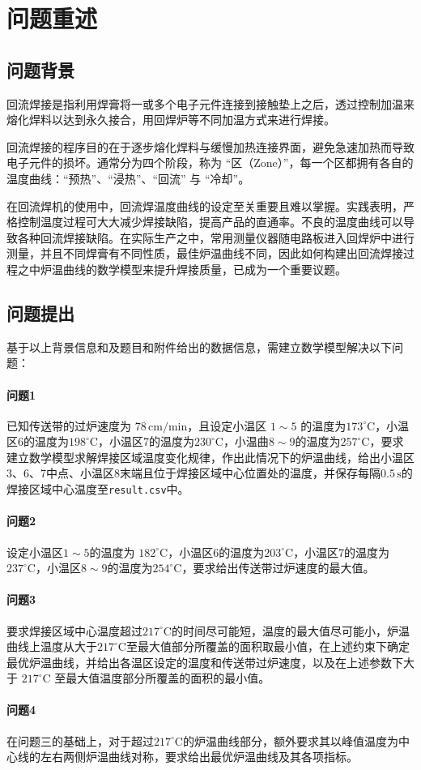 \documentclass[../main.tex]{subfiles}
\begin{document}
\section{问题重述}
\subsection{问题背景}
回流焊接是指利用焊膏将一或多个电子元件连接到接触垫上之后，透过控制加温来熔化焊料以达到永久接合，用回焊炉等不同加温方式来进行焊接。

回流焊接的程序目的在于逐步熔化焊料与缓慢加热连接界面，避免急速加热而导致电子元件的损坏。通常分为四个阶段，称为 “区（Zone）”，每一个区都拥有各自的温度曲线：“预热”、“浸热”、“回流” 与 “冷却”。

在回流焊机的使用中，回流焊温度曲线的设定至关重要且难以掌握。实践表明，严格控制温度过程可大大减少焊接缺陷，提高产品的直通率。不良的温度曲线可以导致各种回流焊接缺陷。在实际生产之中，常用测量仪器随电路板进入回焊炉中进行测量，并且不同焊膏有不同性质，最佳炉温曲线不同，因此如何构建出回流焊接过程之中炉温曲线的数学模型来提升焊接质量，已成为一个重要议题。

\subsection{问题提出} %
基于以上背景信息和及题目和附件给出的数据信息，需建立数学模型解决以下问题：

\paragraph{问题1}
已知传送带的过炉速度为 \(78\,\mathrm{cm}/\mathrm{min}\)，且设定小温区 \(1{\sim}5\) 的温度为\(173^{\circ} \mathrm{C}\)，小温区6的温度为\(198^{\circ}\mathrm{C}\)，小温区7的温度为\(230^{\circ}\mathrm{C}\)，小温曲\(8{ \sim }9\)的温度为\(257^{\circ}\mathrm{C}\)，要求建立数学模型求解焊接区域温度变化规律，作出此情况下的炉温曲线，给出小温区3、6、7中点、小温区8末端且位于焊接区域中心位置处的温度，并保存每隔\(0.5\, \mathrm{s}\)的焊接区域中心温度至\texttt{result.csv}中。

\paragraph{问题2}
设定小温区\(1{\sim}5\)的温度为 \(182^{\circ}\mathrm{C}\)，小温区6的温度为\(203^{\circ}\mathrm{C}\)，小温区7的温度为\(237^{\circ}\mathrm{C}\)，小温区\(8{\sim}9\)的温度为\(254^{\circ}\mathrm{C}\)，要求给出传送带过炉速度的最大值。

\paragraph{问题3}
要求焊接区域中心温度超过\(217^{\circ}\mathrm{C}\)的时间尽可能短，温度的最大值尽可能小，炉温曲线上温度从大于\(217^{\circ}\mathrm{C}\)至最大值部分所覆盖的面积取最小值，在上述约束下确定最优炉温曲线，并给出各温区设定的温度和传送带过炉速度，以及在上述参数下大于 \(217 ^{\circ}\mathrm{C}\) 至最大值温度部分所覆盖的面积的最小值。

\paragraph{问题4}
在问题三的基础上，对于超过\(217 ^{\circ}\mathrm{C}\)的炉温曲线部分，额外要求其以峰值温度为中心线的左右两侧炉温曲线对称，要求给出最优炉温曲线及其各项指标。
\end{document}
